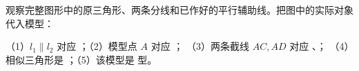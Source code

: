 \documentclass{exam-zh}
\begin{document}

\begin{problem}[points=10]
  \noindent
  \begin{minipage}[t]{\dimexpr\linewidth-60mm-6mm\relax}
    \vspace{0pt}
    观察完整图形中的原三角形、两条分线和已作好的平行辅助线。把图中的实际对象代入模型：

（1）$l_1\parallel l_2$ 对应 \underline{\hspace{2cm}}；（2）模型点 $A$ 对应 \underline{\hspace{1cm}}；
（3）两条截线 $AC,AD$ 对应 \underline{\hspace{1.5cm}}、\underline{\hspace{1.5cm}}；
（4）相似三角形是 \underline{\hspace{4cm}}；（5）该模型是 \underline{\hspace{1.5cm}} 型。


  \end{minipage}\hfill
  \begin{diagramcoltikz}{60mm}{第 4 题图}
  }
  \end{diagramcoltikz}
  \par\medskip
  \answerarea[32mm]
\end{problem}
\end{document}
